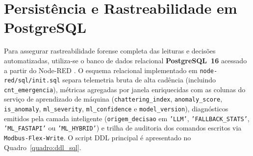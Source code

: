 \section{Persistência e Rastreabilidade em PostgreSQL}
\label{sec:nodered_postgres}

Para assegurar rastreabilidade forense completa das leituras e decisões automatizadas, utiliza-se o banco de dados relacional \textbf{PostgreSQL~16} acessado a partir do Node-RED \cite{postgresql_docs}. O esquema relacional implementado em \texttt{node-red/sql/init.sql} separa telemetria bruta de alta cadência (incluindo \texttt{cnt\_emergencia}), métricas agregadas por janela enriquecidas com as colunas do serviço de aprendizado de máquina (\texttt{chattering\_index}, \texttt{anomaly\_score}, \texttt{is\_anomaly}, \texttt{ml\_severity}, \texttt{ml\_confidence} e \texttt{model\_version}), diagnósticos emitidos pela camada inteligente (\texttt{origem\_decisao} em \texttt{'LLM'}, \texttt{'FALLBACK\_STATS'}, \texttt{'ML\_FASTAPI'} ou \texttt{'ML\_HYBRID'}) e trilha de auditoria dos comandos escritos via \texttt{Modbus-Flex-Write}. O script DDL principal é apresentado no Quadro~\ref{quadro:ddl_sql}.

